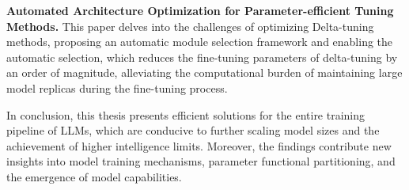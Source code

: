 \begin{abstract*}
\textbf{Automated Architecture Optimization for Parameter-efficient Tuning Methods.} This paper delves into the challenges of optimizing Delta-tuning methods, proposing an automatic module selection framework and enabling the automatic selection, which reduces the fine-tuning parameters of delta-tuning by an order of magnitude, alleviating the computational burden of maintaining large model replicas during the fine-tuning process.
  
In conclusion, this thesis presents efficient solutions for the entire training pipeline of LLMs, which are conducive to further scaling model sizes and the achievement of higher intelligence limits. Moreover, the findings contribute new insights into model training mechanisms, parameter functional partitioning, and the emergence of model capabilities.

\end{abstract*}
